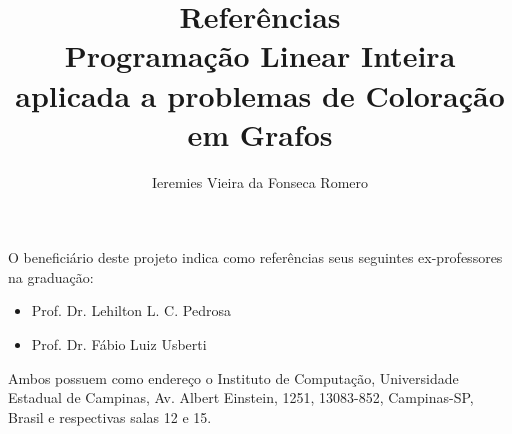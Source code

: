 \documentclass[11pt]{article}
\author{Ieremies Vieira da Fonseca Romero}
\date{}
\title{Referências\\\medskip
\large Programação Linear Inteira aplicada a problemas de Coloração em Grafos}
\begin{document}
\maketitle
O beneficiário deste projeto indica como referências seus seguintes ex-professores na graduação:
\begin{itemize}
\item Prof. Dr. Lehilton L. C. Pedrosa
\item Prof. Dr. Fábio Luiz Usberti
\end{itemize}

Ambos possuem como endereço o Instituto de Computação, Universidade Estadual de Campinas, Av. Albert Einstein, 1251, 13083-852, Campinas-SP, Brasil e respectivas salas 12 e 15.
\end{document}
